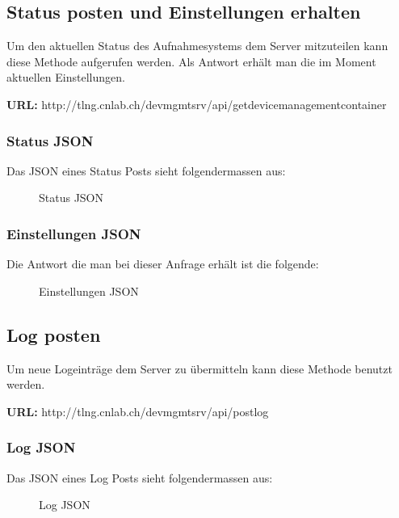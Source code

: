 \subsection{Status posten und Einstellungen erhalten}

Um den aktuellen Status des Aufnahmesystems dem Server mitzuteilen kann diese Methode aufgerufen werden. Als Antwort erhält man die im Moment aktuellen Einstellungen.

{\bf URL: }http://tlng.cnlab.ch/devmgmtsrv/api/getdevicemanagementcontainer 

\subsubsection{Status JSON}

Das JSON eines Status Posts sieht folgendermassen aus:

\begin{figure}[H]
	\centering
	
	\caption{Status JSON}
\end{figure}


\subsubsection{Einstellungen JSON}

Die Antwort die man bei dieser Anfrage erhält ist die folgende:

\begin{figure}[H]
	\centering
	
	\caption{Einstellungen JSON}
\end{figure}


\subsection{Log posten}

Um neue Logeinträge dem Server zu übermitteln kann diese Methode benutzt werden.

{\bf URL: }http://tlng.cnlab.ch/devmgmtsrv/api/postlog

\subsubsection{Log JSON}

Das JSON eines Log Posts sieht folgendermassen aus:

\begin{figure}[H]
	\centering
	
	\caption{Log JSON}
\end{figure}

